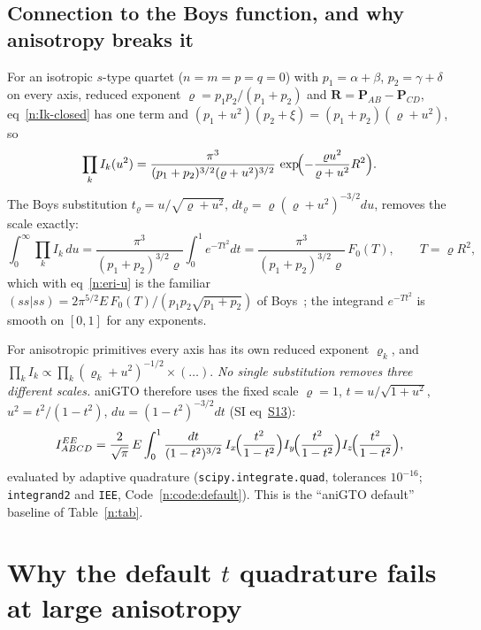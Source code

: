 \documentclass[11pt]{article}
\begin{document}
\subsection{Connection to the Boys function, and why anisotropy breaks it}
For an isotropic $s$-type quartet ($n=m=p=q=0$) with $p_{1}=\alpha+\beta$, $p_{2}=\gamma+\delta$ on every axis,
reduced exponent $\varrho=p_1p_2/(p_1+p_2)$ and $\mathbf R=\mathbf P_{AB}-\mathbf P_{CD}$, eq~\ref{n:Ik-closed}
has one term and $(p_1+u^2)(p_2+\xi)=(p_1+p_2)(\varrho+u^2)$, so
\begin{equation}
\prod_kI_k(u^2)=\frac{\pi^3}{(p_1+p_2)^{3/2}(\varrho+u^2)^{3/2}}\,
\exp\!\Bigl(-\frac{\varrho u^2}{\varrho+u^2}R^2\Bigr).
\label{n:iso}
\end{equation}
The Boys substitution $t_\varrho=u/\sqrt{\varrho+u^2}$, $dt_\varrho=\varrho(\varrho+u^2)^{-3/2}du$, removes the
scale exactly:
\begin{equation}
\int_0^\infty\prod_kI_k\,du=\frac{\pi^3}{(p_1+p_2)^{3/2}\varrho}\int_0^1e^{-Tt^2}dt
=\frac{\pi^3}{(p_1+p_2)^{3/2}\varrho}\,F_0(T),\qquad T=\varrho R^2,
\label{n:boys}
\end{equation}
which with eq~\ref{n:eri-u} is the familiar $(ss|ss)=2\pi^{5/2}E\,F_0(T)/(p_1p_2\sqrt{p_1+p_2})$ of
Boys~\cite{boys1950}; the integrand $e^{-Tt^2}$ is smooth on $[0,1]$ for any exponents.

For anisotropic primitives every axis has its own reduced exponent $\varrho_k$, and
$\prod_kI_k\propto\prod_k(\varrho_k+u^2)^{-1/2}\times(\ldots)$.  \emph{No single substitution removes three
different scales.}  aniGTO therefore uses the fixed scale $\varrho=1$, $t=u/\sqrt{1+u^2}$,
$u^2=t^2/(1-t^2)$, $du=(1-t^2)^{-3/2}dt$ (SI eq~\href{si.pdf\#equation.13}{S13}):
\begin{equation}
I^{EE}_{ABCD}=\frac{2}{\sqrt\pi}\,E\int_0^1\frac{dt}{(1-t^2)^{3/2}}\,
I_x\!\Bigl(\frac{t^2}{1-t^2}\Bigr)I_y\!\Bigl(\frac{t^2}{1-t^2}\Bigr)I_z\!\Bigl(\frac{t^2}{1-t^2}\Bigr),
\label{n:eri-t}
\end{equation}
evaluated by adaptive quadrature (\texttt{scipy.integrate.quad}, tolerances $10^{-16}$; \texttt{integrand2}
and \texttt{IEE}, Code~\ref{n:code:default}).  This is the ``aniGTO default'' baseline of Table~\ref{n:tab}.

\section{Why the default $t$ quadrature fails at large anisotropy}
\label{n:sec:failure}
\end{document}
